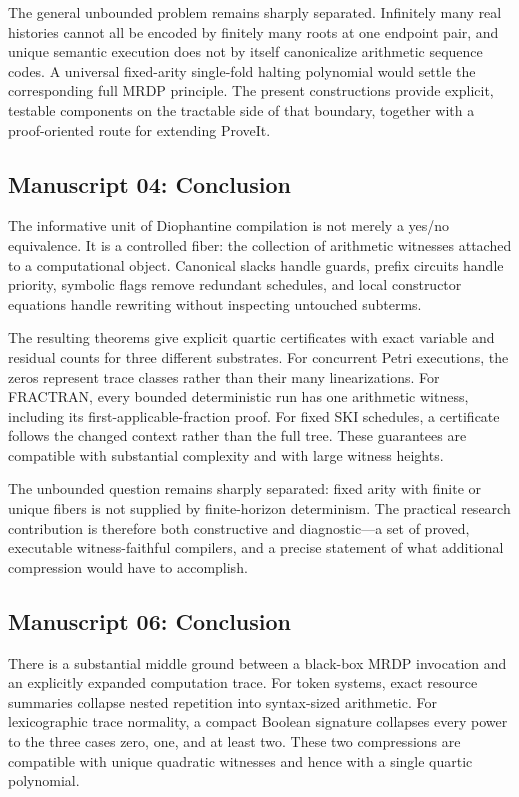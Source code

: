 \documentclass[11pt,a4paper]{article}
\theoremstyle{definition}
\theoremstyle{remark}
\begin{document}
The general unbounded problem remains sharply separated. Infinitely many real histories cannot all be encoded by finitely many roots at one endpoint pair, and unique semantic execution does not by itself canonicalize arithmetic sequence codes. A universal fixed-arity single-fold halting polynomial would settle the corresponding full MRDP principle. The present constructions provide explicit, testable components on the tractable side of that boundary, together with a proof-oriented route for extending ProveIt.


\subsection{Manuscript 04: Conclusion}
The informative unit of Diophantine compilation is not merely a yes/no equivalence. It is a controlled fiber: the collection of arithmetic witnesses attached to a computational object. Canonical slacks handle guards, prefix circuits handle priority, symbolic flags remove redundant schedules, and local constructor equations handle rewriting without inspecting untouched subterms.

The resulting theorems give explicit quartic certificates with exact variable and residual counts for three different substrates. For concurrent Petri executions, the zeros represent trace classes rather than their many linearizations. For FRACTRAN, every bounded deterministic run has one arithmetic witness, including its first-applicable-fraction proof. For fixed SKI schedules, a certificate follows the changed context rather than the full tree. These guarantees are compatible with substantial complexity and with large witness heights.

The unbounded question remains sharply separated: fixed arity with finite or unique fibers is not supplied by finite-horizon determinism. The practical research contribution is therefore both constructive and diagnostic---a set of proved, executable witness-faithful compilers, and a precise statement of what additional compression would have to accomplish.


\subsection{Manuscript 06: Conclusion}

There is a substantial middle ground between a black-box MRDP invocation and
an explicitly expanded computation trace. For token systems, exact resource
summaries collapse nested repetition into syntax-sized arithmetic. For
lexicographic trace normality, a compact Boolean signature collapses every
power to the three cases zero, one, and at least two. These two compressions
are compatible with unique quadratic witnesses and hence with a single
quartic polynomial.
\end{document}

